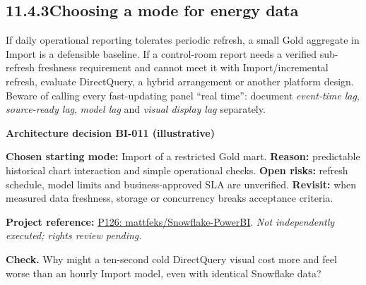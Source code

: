 \documentclass[11pt,twoside]{article}
\newcommand{\topic}[2]{\subsection*{#1\quad #2}}
\newcommand{\repo}[2]{\par\begingroup\fontsize{8.0}{9.6}\selectfont\sffamily\color{inkgray}\textbf{Project reference:} \href{#2}{#1}. \textit{Not independently executed; rights review pending.}\par\endgroup}
\begin{document}
\topic{11.4.3}{Choosing a mode for energy data}
If daily operational reporting tolerates periodic refresh, a small Gold aggregate in Import is a defensible baseline. If a control-room report needs a verified sub-refresh freshness requirement and cannot meet it with Import/incremental refresh, evaluate DirectQuery, a hybrid arrangement or another platform design. Beware of calling every fast-updating panel ``real time'': document \emph{event-time lag}, \emph{source-ready lag}, \emph{model lag} and \emph{visual display lag} separately.
\begin{whitebox}\textbf{Architecture decision BI-011 (illustrative)}\par
\textbf{Chosen starting mode:} Import of a restricted Gold mart. \textbf{Reason:} predictable historical chart interaction and simple operational checks. \textbf{Open risks:} refresh schedule, model limits and business-approved SLA are unverified. \textbf{Revisit:} when measured data freshness, storage or concurrency breaks acceptance criteria.\end{whitebox}
\repo{P126: mattfeks/Snowflake-PowerBI}{https://github.com/mattfeks/Snowflake-PowerBI}
\textbf{Check.} Why might a ten-second cold DirectQuery visual cost more and feel worse than an hourly Import model, even with identical Snowflake data?
\newpage
\end{document}
